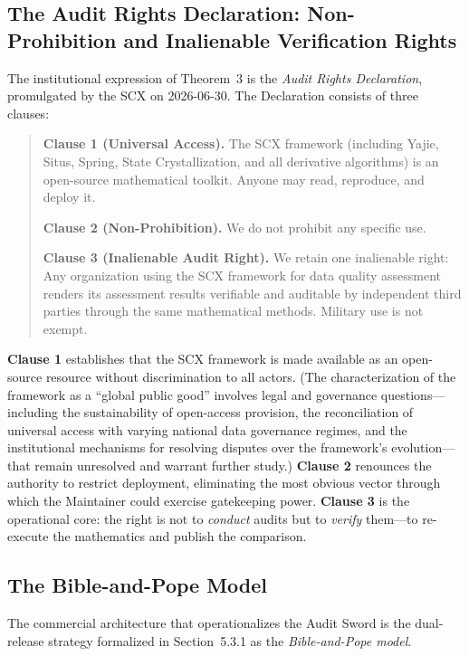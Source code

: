 \documentclass[12pt,a4paper]{ctexart}
\theoremstyle{definition}
\theoremstyle{remark}
\begin{document}
\subsection{The Audit Rights Declaration: Non-Prohibition and Inalienable Verification Rights}

The institutional expression of Theorem~3 is the \textit{Audit Rights Declaration}, promulgated by the SCX on 2026-06-30. The Declaration consists of three clauses:

\begin{quote}
\textbf{Clause 1 (Universal Access).} The SCX framework (including Yajie, Situs, Spring, State Crystallization, and all derivative algorithms) is an open-source mathematical toolkit. Anyone may read, reproduce, and deploy it.

\textbf{Clause 2 (Non-Prohibition).} We do not prohibit any specific use.

\textbf{Clause 3 (Inalienable Audit Right).} We retain one inalienable right: Any organization using the SCX framework for data quality assessment renders its assessment results verifiable and auditable by independent third parties through the same mathematical methods. Military use is not exempt.
\end{quote}

\textbf{Clause 1} establishes that the SCX framework is made available as an open-source resource without discrimination to all actors. (The characterization of the framework as a ``global public good'' involves legal and governance questions—including the sustainability of open-access provision, the reconciliation of universal access with varying national data governance regimes, and the institutional mechanisms for resolving disputes over the framework's evolution—that remain unresolved and warrant further study.) \textbf{Clause 2} renounces the authority to restrict deployment, eliminating the most obvious vector through which the Maintainer could exercise gatekeeping power. \textbf{Clause 3} is the operational core: the right is not to \textit{conduct} audits but to \textit{verify} them—to re-execute the mathematics and publish the comparison.

\subsection{The Bible-and-Pope Model}

The commercial architecture that operationalizes the Audit Sword is the dual-release strategy formalized in Section~5.3.1 as the \textit{Bible-and-Pope model}.
\end{document}
